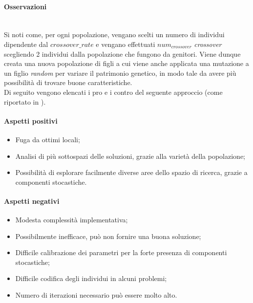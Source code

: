 \noindent \paragraph{Osservazioni}\hfill\\
Si noti come, per ogni popolazione, vengano scelti un numero di individui dipendente dal {$crossover\_rate$}
e vengano effettuati {$num_{crossover}$} \textit{crossover} scegliendo 2 individui dalla popolazione che fungono da genitori.
Viene dunque creata una nuova popolazione di figli a cui viene anche applicata una mutazione a un figlio \textit{random} per
variare il patrimonio genetico, in modo tale da avere più possibilità di trovare buone caratteristiche.\\
Di seguito vengono elencati i pro e i contro del seguente approccio (come riportato in \cite{siteP:articolo-alg-gen} \cite{siteQ:paper-lo-go}).\\

\noindent \paragraph{Aspetti positivi}
\begin{itemize}
    \item Fuga da ottimi locali;
    \item Analisi di più sottospazi delle soluzioni, grazie alla varietà della popolazione;
    \item Possibilità di esplorare facilmente diverse aree dello spazio di ricerca, grazie a componenti stocastiche.
\end{itemize}

\noindent \paragraph{Aspetti negativi}
\begin{itemize}
    \item Modesta complessità implementativa;
    \item Possibilmente inefficace, può non fornire una buona soluzione;
    \item Difficile calibrazione dei parametri per la forte presenza di componenti stocastiche;
    \item Difficile codifica degli individui in alcuni problemi;
    \item Numero di iterazioni necessario può essere molto alto.
\end{itemize}
\newpage
